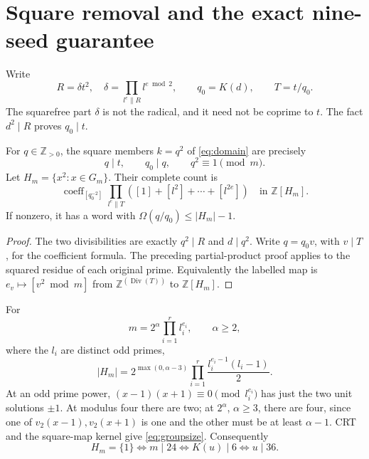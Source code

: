 \section{Square removal and the exact nine-seed guarantee}
Write
\[
 R=\delta t^2,\quad\delta=\prod_{l^e\parallel R}l^{e\bmod2},\qquad
 q_0=K(d),\qquad T=t/q_0.
\]
The squarefree part $\delta$ is not the radical, and it need not be coprime to $t$.
The fact $d^2\mid R$ proves $q_0\mid t$.
\begin{proposition}\label{prop:square}
For $q\in\mathbb Z_{>0}$, the square members $k=q^2$ of
\eqref{eq:domain} are precisely
\begin{equation}\label{eq:square}
 q\mid t,\qquad q_0\mid q,\qquad q^2\equiv1\pmod m.
\end{equation}
Let $H_m=\{x^2:x\in G_m\}$. Their complete count is
\begin{equation}\label{eq:squarepoly}
 \operatorname{coeff}_{[q_0^{-2}]}
 \prod_{l^e\parallel T}
       \left([1]+[l^2]+\cdots+[l^{2e}]\right)
       \quad\text{in }\mathbb Z[H_m].
\end{equation}
If nonzero, it has a word with $\Omega(q/q_0)\le |H_m|-1$.
\end{proposition}
\begin{proof}
The two divisibilities are exactly $q^2\mid R$ and $d\mid q^2$.
Write $q=q_0v$, with $v\mid T$, for the coefficient formula. The preceding
partial-product proof applies to the squared residue of each original prime.
Equivalently the labelled map is
$e_v\mapsto[v^2\bmod m]$ from
$\mathbb Z^{(\operatorname{Div}(T))}$ to $\mathbb Z[H_m]$.
\end{proof}

For
\[
 m=2^\alpha\prod_{i=1}^{r}l_i^{e_i},
 \qquad \alpha\ge2,
\]
where the $l_i$ are distinct odd primes,
\begin{equation}\label{eq:groupsize}
 |H_m|=2^{\max(0,\alpha-3)}
       \prod_{i=1}^{r}\frac{l_i^{e_i-1}(l_i-1)}2.
\end{equation}
At an odd prime power,
$(x-1)(x+1)\equiv0\pmod{l_i^{e_i}}$ has just the two unit solutions $\pm1$.
At modulus four there are two; at $2^\alpha$, $\alpha\ge3$, there are four,
since one of $v_2(x-1),v_2(x+1)$ is one and the other must be at least
$\alpha-1$. CRT and the square-map kernel give \eqref{eq:groupsize}.
Consequently
\begin{equation}\label{eq:nine}
 H_m=\{1\}\iff m\mid24\iff K(u)\mid6\iff
 \boxed{u\mid36.}
\end{equation}


